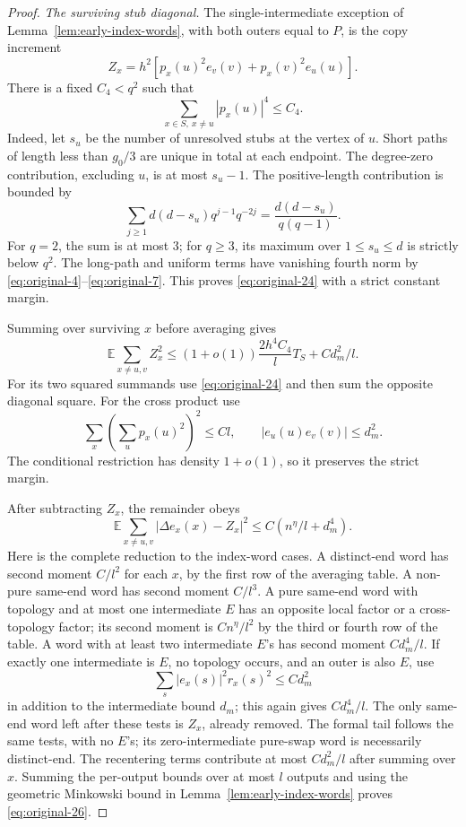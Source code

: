 \begin{proof}
\par\smallskip\noindent\textit{The surviving stub diagonal.}\quad
The single-intermediate exception of
Lemma~\ref{lem:early-index-words}, with both outers equal to \(P\),
is the copy increment
\[
 Z_x=h^2[p_x(u)^2e_v(v)+p_x(v)^2e_u(u)].
\]
There is a fixed \(C_4<q^2\) such that
\begin{equation}
 \sum_{x\in S,\ x\ne u}|p_x(u)|^4\le C_4.
\label{eq:original-24}
\end{equation}
Indeed, let \(s_u\) be the number of unresolved stubs at the vertex
of \(u\). Short paths of length less than \(g_0/3\) are unique
in total at each endpoint. The degree-zero contribution, excluding
\(u\), is at most \(s_u-1\). The positive-length contribution is
bounded by
\[
 \sum_{j\ge1}d(d-s_u)q^{j-1}q^{-2j}
 =\frac{d(d-s_u)}{q(q-1)}.
\]
For \(q=2\), the sum is at most 3; for \(q\ge3\), its maximum
over \(1\le s_u\le d\) is strictly below \(q^2\).
The long-path and uniform terms have vanishing fourth norm by
\eqref{eq:original-4}--\eqref{eq:original-7}. This proves
\eqref{eq:original-24} with a strict constant margin.

Summing over surviving \(x\) before averaging gives
\begin{equation}
 \mathbb E\sum_{x\ne u,v}Z_x^2
 \le(1+o(1))\frac{2h^4C_4}{l}T_S+Cd_m^2/l.
\label{eq:original-25}
\end{equation}
For its two squared summands use \eqref{eq:original-24} and then
sum the opposite diagonal square. For the cross product use
\[
 \sum_x\left(\sum_u p_x(u)^2\right)^2\le Cl,
 \qquad |e_u(u)e_v(v)|\le d_m^2.
\]
The conditional restriction has density \(1+o(1)\), so it preserves
the strict margin.

After subtracting \(Z_x\), the remainder obeys
\begin{equation}
 \mathbb E\sum_{x\ne u,v}|\Delta e_x(x)-Z_x|^2
 \le C(n^\eta/l+d_m^4).
\label{eq:original-26}
\end{equation}
Here is the complete reduction to the index-word cases.
A distinct-end word has second moment \(C/l^2\) for each \(x\),
by the first row of the averaging table. A non-pure same-end word
has second moment \(C/l^3\). A pure same-end word with topology
and at most one intermediate \(E\) has an opposite local factor
or a cross-topology factor; its second moment is
\(Cn^\eta/l^2\) by the third or fourth row of the table.
A word with at least two intermediate \(E\)'s has second moment
\(Cd_m^4/l\). If exactly one intermediate is \(E\), no topology
occurs, and an outer is also \(E\), use
\[
 \sum_s |e_x(s)|^2r_x(s)^2\le Cd_m^2
\]
in addition to the intermediate bound \(d_m\); this again gives
\(Cd_m^4/l\). The only same-end word left after these tests is
\(Z_x\), already removed. The formal tail follows the same tests,
with no \(E\)'s; its zero-intermediate pure-swap word is
necessarily distinct-end. The recentering terms contribute at most
\(Cd_m^2/l\) after summing over \(x\). Summing the per-output
bounds over at most \(l\) outputs and using the geometric
Minkowski bound in Lemma~\ref{lem:early-index-words} proves
\eqref{eq:original-26}.


\end{proof}
